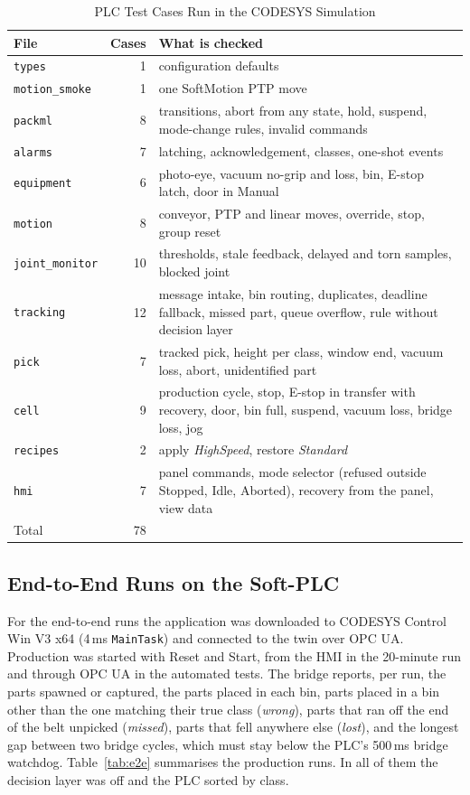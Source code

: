 \begin{table}[t]
\caption{PLC Test Cases Run in the CODESYS Simulation}
\label{tab:plctests}
\centering
\footnotesize
\begin{tabular}{@{}lrp{5.0cm}@{}}
\toprule
File & Cases & What is checked \\
\midrule
\texttt{types} & 1 & configuration defaults \\
\texttt{motion\_smoke} & 1 & one SoftMotion PTP move \\
\texttt{packml} & 8 & transitions, abort from any state, hold, suspend, mode-change rules, invalid commands \\
\texttt{alarms} & 7 & latching, acknowledgement, classes, one-shot events \\
\texttt{equipment} & 6 & photo-eye, vacuum no-grip and loss, bin, E-stop latch, door in Manual \\
\texttt{motion} & 8 & conveyor, PTP and linear moves, override, stop, group reset \\
\texttt{joint\_monitor} & 10 & thresholds, stale feedback, delayed and torn samples, blocked joint \\
\texttt{tracking} & 12 & message intake, bin routing, duplicates, deadline fallback, missed part, queue overflow, rule without decision layer \\
\texttt{pick} & 7 & tracked pick, height per class, window end, vacuum loss, abort, unidentified part \\
\texttt{cell} & 9 & production cycle, stop, E-stop in transfer with recovery, door, bin full, suspend, vacuum loss, bridge loss, jog \\
\texttt{recipes} & 2 & apply \emph{HighSpeed}, restore \emph{Standard} \\
\texttt{hmi} & 7 & panel commands, mode selector (refused outside Stopped, Idle, Aborted), recovery from the panel, view data \\
\midrule
Total & 78 & \\
\bottomrule
\end{tabular}
\end{table}

\subsection{End-to-End Runs on the Soft-PLC}

For the end-to-end runs the application was downloaded to CODESYS Control Win V3 x64 (4\,ms
\texttt{MainTask}) and connected to the twin over OPC UA. Production was started with Reset and
Start, from the HMI in the 20-minute run and through OPC UA in the automated tests. The bridge
reports, per run, the parts spawned or captured, the parts placed in each bin, parts placed in a
bin other than the one matching their true class (\emph{wrong}), parts that ran off the end of
the belt unpicked (\emph{missed}), parts that fell anywhere else (\emph{lost}), and the longest gap
between two bridge cycles, which must stay below the PLC's 500\,ms bridge watchdog.
Table~\ref{tab:e2e} summarises the production runs. In all of them the decision layer was off and
the PLC sorted by class.

